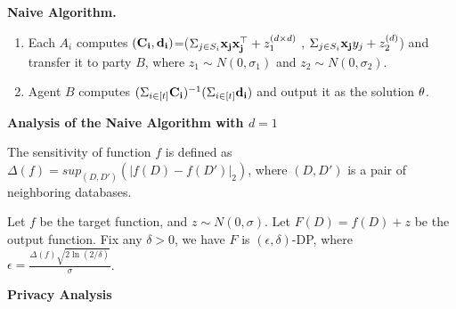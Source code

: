 \documentclass[11pt]{article}
\begin{document}
{\bf Naive Algorithm. }

\begin{enumerate}
\item Each $A_{i}$ computes  $\bf {(C_{i}, d_{i})}$=($\Sigma_{j \in S_{i}} {\bf x_{j} x_{j}^{\top}}+ z_{1}^{(d\times d)}$ , $\Sigma_{j \in S_{i}} {\bf x_{j}} y_{j} + z_{2}^{(d)}$) and transfer it to party $B$, where $z_{1} \sim N(0, \sigma_{1})$ and $z_{2} \sim N(0, \sigma_{2})$.
\item Agent $B$ computes $(\Sigma_{i \in [t]} {\bf C_{i}})^{-1} (\Sigma_{i \in [t]} {\bf d_{i}}) $ and output it as the solution $\bf \theta$.
\end{enumerate}

{\bf Analysis of the Naive Algorithm with $d=1$}

\begin{definition}
The sensitivity of function $f$ is defined as $\Delta(f) = sup_{(D,D')}(|f(D)-f(D')|_{2})$, where $(D,D')$ is a pair of neighboring databases.
\end{definition}

\begin{theorem}
Let $f$ be the target function, and $z \sim N(0, \sigma)$. Let $F(D)= f(D) + z$ be the output function. Fix any $\delta >0$, we have $F$ is $(\epsilon, \delta)$-DP, where $\epsilon = \frac{\Delta(f) \sqrt{2\ln (2/\delta)}}{\sigma}$.
\end{theorem}


{\bf Privacy Analysis}
\end{document}
